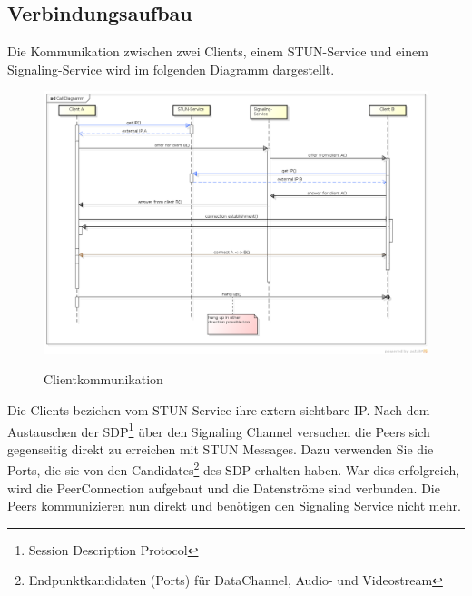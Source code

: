 	\subsection{Verbindungsaufbau}
		Die Kommunikation zwischen zwei Clients, einem STUN-Service und einem
		Signaling-Service wird im folgenden Diagramm dargestellt.
		\begin{figure}[H]
			\centering
			\includegraphics[width=\textwidth]{../architekturanalayse/img/callDiagramm.png}
			\label{img:deployment}
			\caption{Clientkommunikation}
		\end{figure}
		Die Clients beziehen vom STUN-Service ihre extern sichtbare IP. Nach dem Austauschen der SDP\footnote{Session Description Protocol\cite{IETF-SDP-RFC}} über den Signaling Channel versuchen die Peers sich gegenseitig direkt zu erreichen mit STUN Messages. Dazu verwenden Sie die Ports, die sie von den Candidates\footnote{Endpunktkandidaten (Ports) für DataChannel, Audio- und Videostream} des SDP erhalten haben.
		War dies erfolgreich, wird die PeerConnection aufgebaut und die Datenströme sind verbunden. Die Peers kommunizieren nun direkt und benötigen den Signaling Service nicht mehr.
				
